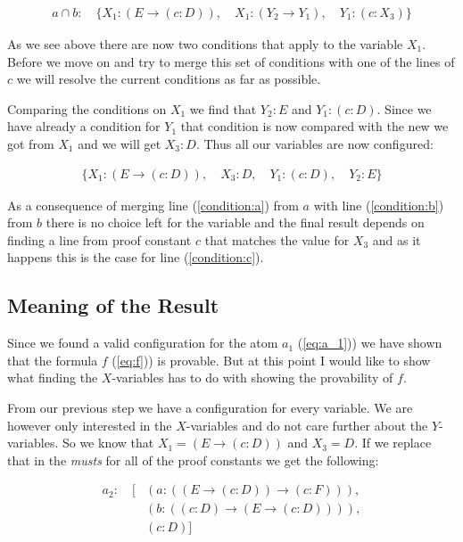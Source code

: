 \begin{align}
	a \cap b: \quad \{X_1: (E \rightarrow (c:D)), \quad X_1: (Y_2 \rightarrow Y_1), \quad Y_1: (c:X_3)\}
\end{align}

As we see above there are now two conditions that apply to the variable $X_1$. Before we move on and try to merge this set of conditions with one of the lines of $c$ we will resolve the current conditions as far as possible.

Comparing the conditions on $X_1$ we find that $Y_2: E$ and $Y_1: (c:D)$. Since we have already a condition for $Y_1$ that condition is now compared with the new we got from $X_1$ and we will get $X_3: D$. Thus all our variables are now configured:

\begin{align}
	\{X_1: (E \rightarrow (c:D)), \quad X_3: D, \quad Y_1: (c:D), \quad Y_2: E\}
\end{align}

As a consequence of merging line (\ref{condition:a}) from $a$ with line (\ref{condition:b}) from $b$ there is no choice left for the variable and the final result depends on finding a line from proof constant $c$ that matches the value for $X_3$ and as it happens this is the case for line (\ref{condition:c}).


\subsection{Meaning of the Result}
Since we found a valid configuration for the atom $a_1$ (\ref{eq:a_1})) we have shown that the formula $f$ (\ref{eq:f})) is provable. But at this point I would like to show what finding the $X$-variables has to do with showing the provability of $f$.

From our previous step we have a configuration for every variable. We are however only interested in the $X$-variables and do not care further about the $Y$-variables. So we know that $X_1 = (E \rightarrow (c:D))$ and $X_3 = D$. If we replace that in the \emph{musts} for all of the proof constants we get the following:

\begin{equation}
\begin{split}
	a_2: \quad [&(a: ((E \rightarrow (c:D)) \rightarrow (c:F))), \\
	&(b: ((c:D) \rightarrow (E \rightarrow (c:D)))), \\
	&(c: D)]
\end{split}
\end{equation}

